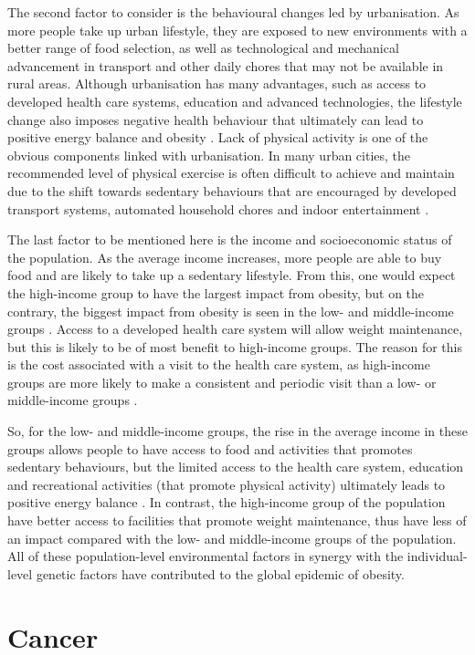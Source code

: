 The second factor to consider is the behavioural changes led by urbanisation.
As more people take up urban lifestyle, they are exposed to new environments with a better range of food selection, as well as technological and mechanical advancement in transport and other daily chores that may not be available in rural areas.
Although urbanisation has many advantages, such as access to developed health care systems, education and advanced technologies, the lifestyle change also imposes negative health behaviour that ultimately can lead to positive energy balance and obesity \citep{Malik2013}.
Lack of physical activity is one of the obvious components linked with urbanisation.
In many urban cities, the recommended level of physical exercise is often difficult to achieve and maintain due to the shift towards sedentary behaviours that are encouraged by developed transport systems, automated household chores and indoor entertainment \citep{Malik2013}.

The last factor to be mentioned here is the income and socioeconomic status of the population.
As the average income increases, more people are able to buy food and are likely to take up a sedentary lifestyle.
From this, one would expect the high-income group to have the largest impact from obesity, but on the contrary, the biggest impact from obesity is seen in the low- and middle-income groups \citep{Malik2013}.
Access to a developed health care system will allow weight maintenance, but this is likely to be of most benefit to high-income groups.
The reason for this is the cost associated with a visit to the health care system, as high-income groups are more likely to make a consistent and periodic visit than a low- or middle-income groups \citep{Malik2013}.

So, for the low- and middle-income groups, the rise in the average income in these groups allows people to have access to food and activities that promotes sedentary behaviours, but the limited access to the health care system, education and recreational activities (that promote physical activity) ultimately leads to positive energy balance \citep{Malik2013}.
In contrast, the high-income group of the population have better access to facilities that promote weight maintenance, thus have less of an impact compared with the low- and middle-income groups of the population.
All of these population-level environmental factors in synergy with the individual-level genetic factors have contributed to the global epidemic of obesity.

\section{Cancer}
\label{sec:cancer}

